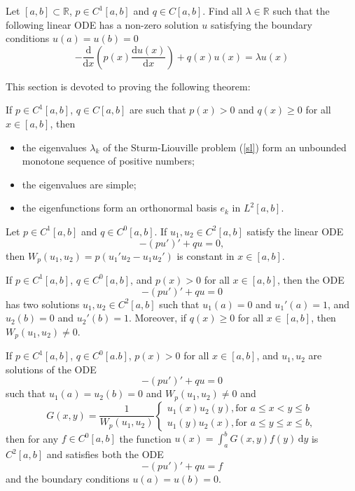 \documentclass[a4paper]{article}
\newcommand{\R}{\mathbb{R}}
\newcommand{\integ}[4]{\int_{#1}^{#2}\!{#3}\,\mathrm{d}{#4}}
\newcommand{\deriv}[2]{\frac{\mathrm{d}{#1}}{\mathrm{d}{#2}}}
\newcommand{\oneover}[1]{\frac{1}{#1}}
\newcommand{\<}{\langle}
\renewcommand{\>}{\rangle}
\newcommand{\la}{\lambda}
\begin{document}
Let $[a,b]\subset\R$, $p\in C^1[a,b]$ and $q\in C[a,b]$. Find all $\la\in\R$ such that the following linear ODE has a non-zero solution $u$ satisfying the boundary conditions $u(a)=u(b)=0$
\begin{equation}\label{sl}
  -\deriv{}{x}\left(p(x)\deriv{u(x)}{x}\right) + q(x)u(x) = \la u(x)
\end{equation}

This section is devoted to proving the following theorem:

\begin{thm}
  If $p\in C^1[a,b]$, $q\in C[a,b]$ are such that $p(x)>0$ and $q(x)\geq0$ for all $x\in[a,b]$, then
  \begin{itemize}
    \item the eigenvalues $\la_k$ of the Sturm-Liouville problem (\ref{sl}) form an unbounded monotone sequence of positive numbers;
    \item the eigenvalues are simple;
    \item the eigenfunctions form an orthonormal basis $e_k$ in $L^2[a,b]$.
  \end{itemize}
\end{thm}

\begin{lemma}
  Let $p\in C^1[a,b]$ and $q\in C^0[a,b]$. If $u_1,u_2\in C^2[a,b]$ satisfy the linear ODE
  $$-(pu')'+qu=0,$$
  then $W_p(u_1,u_2)=p(u_1'u_2-u_1u_2')$ is constant in $x\in[a,b]$.
\end{lemma}

\begin{lemma}
  If $p\in C^1[a,b]$, $q\in C^0[a,b]$, and $p(x)>0$ for all $x\in[a,b]$, then the ODE
  $$-(pu')'+qu=0$$
  has two solutions $u_1,u_2\in C^2[a,b]$ such that $u_1(a)=0$ and $u_1'(a)=1$, and $u_2(b)=0$ and $u_2'(b)=1$. Moreover, if $q(x)\geq0$ for all $x\in[a,b]$, then $W_p(u_1,u_2)\neq0$.
\end{lemma}

\begin{lemma}
  If $p\in C^1[a,b]$, $q\in C^0[a.b]$, $p(x)>0$ for all $x\in[a,b]$, and $u_1,u_2$ are solutions of the ODE
  $$-(pu')'+qu=0$$
  such that $u_1(a)=u_2(b)=0$ and $W_p(u_1,u_2)\neq0$ and
  $$G(x,y) = \oneover{W_p(u_1,u_2)}\begin{cases}
      u_1(x)u_2(y),\text{for }a\leq x<y\leq b\\
      u_1(y)u_2(x),\text{for }a\leq y\leq x\leq b,
  \end{cases}$$
  then for any $f\in C^0[a,b]$ the function $u(x)=\integ{a}{b}{G(x,y)f(y)}{y}$ is $C^2[a,b]$ and satisfies both the  ODE
  $$-(pu')'+qu=f$$
  and the boundary conditions $u(a)=u(b)=0$.
\end{lemma}
\end{document}
